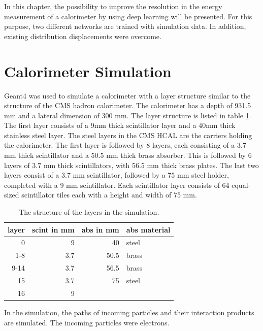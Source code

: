 \documentclass[12pt, a4paper]{thesis}
\begin{document}
In this chapter, the possibility to improve the resolution in the
energy measurement of a calorimeter by using deep learning will be
presented. For this purpose, two different networks are trained with
simulation data. In addition, existing distribution displacements were
overcome.


\section{Calorimeter Simulation}
\label{sec:org905cdeb}

Geant4 \cite{geant_simul_toolkit} was used to simulate a calorimeter
with a layer structure similar to the structure of the CMS hadron
calorimeter. The calorimeter has a depth of 931.5 mm and a lateral
dimension of 300 mm. The layer structure is listed in table
\ref{fcn_structure}. The first layer consists of a 9mm thick
scintillator layer and a 40mm thick stainless steel layer. The steel
layers in the CMS HCAL are the carriers holding the calorimeter. The
first layer is followed by 8 layers, each consisting of a 3.7 mm thick
scintillator and a 50.5 mm thick brass absorber. This is followed by 6
layers of 3.7 mm thick scintillators, with 56.5 mm thick brass plates.
The last two layers consist of a 3.7 mm scintillator, followed by a 75
mm steel holder, completed with a 9 mm scintillator. Each scintillator
layer consists of 64 equal-sized scintillator tiles each with a height
and width of 75 mm.

\begin{table}[htbp]
  \centering
  \begin{tabular}{rrrl}
    layer & scint in mm & abs in mm & abs material\\
    \hline
    0 & 9 & 40 & steel\\
    1-8 & 3.7 & 50.5 & brass\\
    9-14 & 3.7 & 56.5 & brass\\
    15 & 3.7 & 75 & steel\\
    16 & 9 &  & \\
  \end{tabular}
  \caption{The structure of the layers in the simulation.}
  \label{fcn_structure}
\end{table}

In the simulation, the paths of incoming particles and their
interaction products are simulated. The incoming particles were
electrons.
\end{document}
